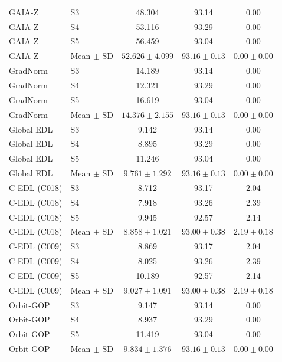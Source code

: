 \begin{longtable}{@{}llccc@{}}
GAIA-Z & S3 & 48.304 & 93.14 & 0.00 \\
GAIA-Z & S4 & 53.116 & 93.29 & 0.00 \\
GAIA-Z & S5 & 56.459 & 93.04 & 0.00 \\
GAIA-Z & Mean $\pm$ SD & $52.626 \pm 4.099$ & $93.16 \pm 0.13$ & $0.00 \pm 0.00$ \\
GradNorm & S3 & 14.189 & 93.14 & 0.00 \\
GradNorm & S4 & 12.321 & 93.29 & 0.00 \\
GradNorm & S5 & 16.619 & 93.04 & 0.00 \\
GradNorm & Mean $\pm$ SD & $14.376 \pm 2.155$ & $93.16 \pm 0.13$ & $0.00 \pm 0.00$ \\
Global EDL & S3 & 9.142 & 93.14 & 0.00 \\
Global EDL & S4 & 8.895 & 93.29 & 0.00 \\
Global EDL & S5 & 11.246 & 93.04 & 0.00 \\
Global EDL & Mean $\pm$ SD & $9.761 \pm 1.292$ & $93.16 \pm 0.13$ & $0.00 \pm 0.00$ \\
C-EDL (C018) & S3 & 8.712 & 93.17 & 2.04 \\
C-EDL (C018) & S4 & 7.918 & 93.26 & 2.39 \\
C-EDL (C018) & S5 & 9.945 & 92.57 & 2.14 \\
C-EDL (C018) & Mean $\pm$ SD & $8.858 \pm 1.021$ & $93.00 \pm 0.38$ & $2.19 \pm 0.18$ \\
C-EDL (C009) & S3 & 8.869 & 93.17 & 2.04 \\
C-EDL (C009) & S4 & 8.025 & 93.26 & 2.39 \\
C-EDL (C009) & S5 & 10.189 & 92.57 & 2.14 \\
C-EDL (C009) & Mean $\pm$ SD & $9.027 \pm 1.091$ & $93.00 \pm 0.38$ & $2.19 \pm 0.18$ \\
Orbit-GOP & S3 & 9.147 & 93.14 & 0.00 \\
Orbit-GOP & S4 & 8.937 & 93.29 & 0.00 \\
Orbit-GOP & S5 & 11.419 & 93.04 & 0.00 \\
Orbit-GOP & Mean $\pm$ SD & $9.834 \pm 1.376$ & $93.16 \pm 0.13$ & $0.00 \pm 0.00$ \\
\end{longtable}
\endgroup
